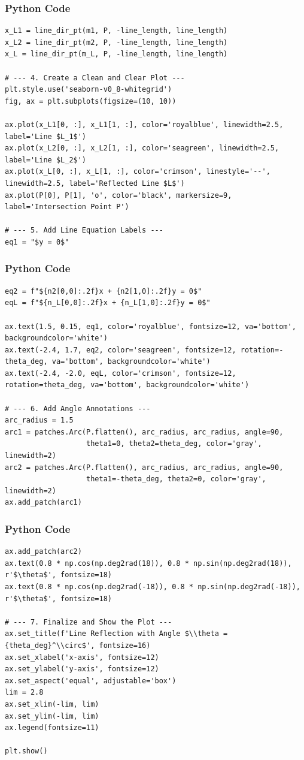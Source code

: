 \documentclass{beamer}
\begin{document}
\begin{frame}[fragile]
\frametitle{Python Code}
\begin{lstlisting}
x_L1 = line_dir_pt(m1, P, -line_length, line_length)
x_L2 = line_dir_pt(m2, P, -line_length, line_length)
x_L = line_dir_pt(m_L, P, -line_length, line_length)

# --- 4. Create a Clean and Clear Plot ---
plt.style.use('seaborn-v0_8-whitegrid')
fig, ax = plt.subplots(figsize=(10, 10))

ax.plot(x_L1[0, :], x_L1[1, :], color='royalblue', linewidth=2.5, label='Line $L_1$')
ax.plot(x_L2[0, :], x_L2[1, :], color='seagreen', linewidth=2.5, label='Line $L_2$')
ax.plot(x_L[0, :], x_L[1, :], color='crimson', linestyle='--', linewidth=2.5, label='Reflected Line $L$')
ax.plot(P[0], P[1], 'o', color='black', markersize=9, label='Intersection Point P')

# --- 5. Add Line Equation Labels ---
eq1 = "$y = 0$"
\end{lstlisting}
\end{frame}
\begin{frame}[fragile]
\frametitle{Python Code}
\begin{lstlisting}
eq2 = f"${n2[0,0]:.2f}x + {n2[1,0]:.2f}y = 0$"
eqL = f"${n_L[0,0]:.2f}x + {n_L[1,0]:.2f}y = 0$"

ax.text(1.5, 0.15, eq1, color='royalblue', fontsize=12, va='bottom', backgroundcolor='white')
ax.text(-2.4, 1.7, eq2, color='seagreen', fontsize=12, rotation=-theta_deg, va='bottom', backgroundcolor='white')
ax.text(-2.4, -2.0, eqL, color='crimson', fontsize=12, rotation=theta_deg, va='bottom', backgroundcolor='white')

# --- 6. Add Angle Annotations ---
arc_radius = 1.5
arc1 = patches.Arc(P.flatten(), arc_radius, arc_radius, angle=90, 
                   theta1=0, theta2=theta_deg, color='gray', linewidth=2)
arc2 = patches.Arc(P.flatten(), arc_radius, arc_radius, angle=90, 
                   theta1=-theta_deg, theta2=0, color='gray', linewidth=2)
ax.add_patch(arc1)
\end{lstlisting}
\end{frame}
\begin{frame}[fragile]
\frametitle{Python Code}
\begin{lstlisting}
ax.add_patch(arc2)
ax.text(0.8 * np.cos(np.deg2rad(18)), 0.8 * np.sin(np.deg2rad(18)), r'$\theta$', fontsize=18)
ax.text(0.8 * np.cos(np.deg2rad(-18)), 0.8 * np.sin(np.deg2rad(-18)), r'$\theta$', fontsize=18)

# --- 7. Finalize and Show the Plot ---
ax.set_title(f'Line Reflection with Angle $\\theta = {theta_deg}^\\circ$', fontsize=16)
ax.set_xlabel('x-axis', fontsize=12)
ax.set_ylabel('y-axis', fontsize=12)
ax.set_aspect('equal', adjustable='box')
lim = 2.8
ax.set_xlim(-lim, lim)
ax.set_ylim(-lim, lim)
ax.legend(fontsize=11)

plt.show()
\end{lstlisting}
\end{frame}
\end{document}
